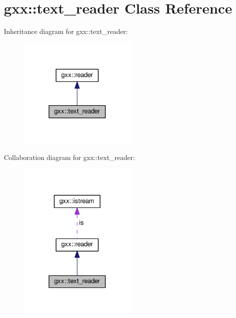 \hypertarget{classgxx_1_1text__reader}{}\section{gxx\+:\+:text\+\_\+reader Class Reference}
\label{classgxx_1_1text__reader}


Inheritance diagram for gxx\+:\+:text\+\_\+reader\+:
\nopagebreak
\begin{figure}[H]
\begin{center}
\leavevmode
\includegraphics[width=167pt]{classgxx_1_1text__reader__inherit__graph}
\end{center}
\end{figure}


Collaboration diagram for gxx\+:\+:text\+\_\+reader\+:
\nopagebreak
\begin{figure}[H]
\begin{center}
\leavevmode
\includegraphics[width=167pt]{classgxx_1_1text__reader__coll__graph}
\end{center}
\end{figure}
